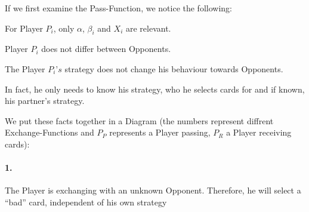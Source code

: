 If we first examine the Pass-Function, we notice the following:\\
\begin{axioms}[(F1)]
\item For Player $P_i$, only $\alpha$, $\beta_i$ and $X_i$ are relevant.
\item Player $P_i$ does not differ between Opponents. 
\item The Player $P_i’s$ strategy does not change his behaviour towards Opponents. 
\item In fact, he only needs to know his strategy, who he selects cards for and if known, his partner’s strategy. 
\end{axioms}

We put these facts together in a Diagram (the numbers represent diffrent Exchange-Functions and $P_P$ represents a Player passing, $P_R$ a Player receiving cards):

\begin{table}[h]
\label{tab:my-table}
\end{table}
\paragraph{1.}
The Player is exchanging with an unknown Opponent. Therefore, he will select a “bad” card, independent of his own strategy
